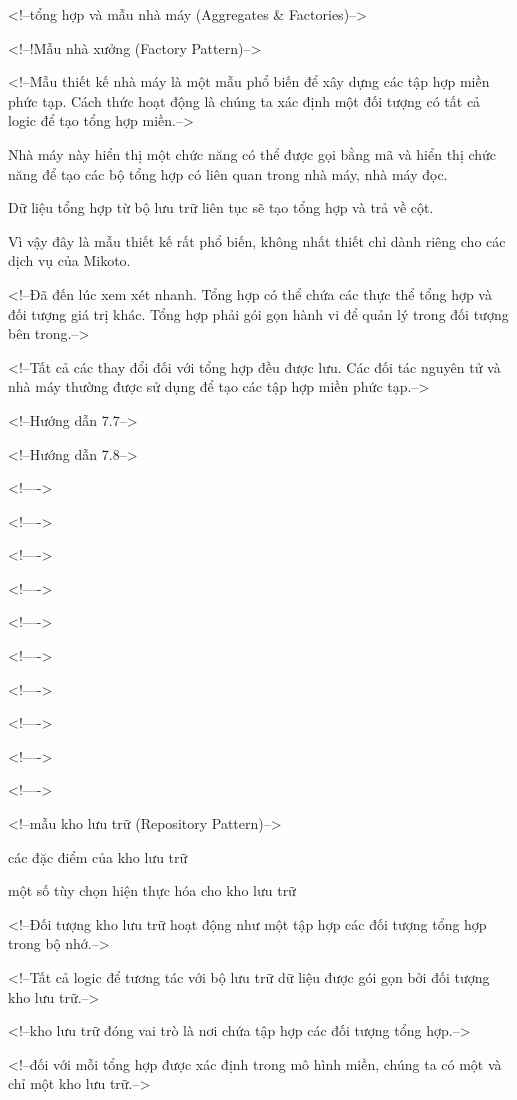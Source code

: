 <!--tổng hợp và mẫu nhà máy (Aggregates & Factories)-->

<!--!Mẫu nhà xưởng (Factory Pattern)-->

<!--Mẫu thiết kế nhà máy là một mẫu phổ biến để xây dựng các tập hợp miền phức tạp. Cách thức hoạt động là chúng ta xác định một đối tượng có tất cả logic để tạo tổng hợp miền.-->

Nhà máy này hiển thị một chức năng có thể được gọi bằng mã và hiển thị chức năng để tạo các bộ tổng hợp có liên quan trong nhà máy, nhà máy đọc.

Dữ liệu tổng hợp từ bộ lưu trữ liên tục sẽ tạo tổng hợp và trả về cột.

Vì vậy đây là mẫu thiết kế rất phổ biến, không nhất thiết chỉ dành riêng cho các dịch vụ của Mikoto.

<!--Đã đến lúc xem xét nhanh. Tổng hợp có thể chứa các thực thể tổng hợp và đối tượng giá trị khác. Tổng hợp phải gói gọn hành vi để quản lý trong đối tượng bên trong.-->

<!--Tất cả các thay đổi đối với tổng hợp đều được lưu. Các đối tác nguyên tử và nhà máy thường được sử dụng để tạo các tập hợp miền phức tạp.-->

<!--Hướng dẫn 7.7-->

<!--Hướng dẫn 7.8-->

<!---->

<!---->

<!---->

<!---->

<!---->

<!---->

<!---->

<!---->

<!---->

<!---->

<!--mẫu kho lưu trữ (Repository Pattern)-->

các đặc điểm của kho lưu trữ

một số tùy chọn hiện thực hóa cho kho lưu trữ

<!--Đối tượng kho lưu trữ hoạt động như một tập hợp các đối tượng tổng hợp trong bộ nhớ.-->

<!--Tất cả logic để tương tác với bộ lưu trữ dữ liệu được gói gọn bởi đối tượng kho lưu trữ.-->

<!--kho lưu trữ đóng vai trò là nơi chứa tập hợp các đối tượng tổng hợp.-->

<!--đối với mỗi tổng hợp được xác định trong mô hình miền, chúng ta có một và chỉ một kho lưu trữ.-->

